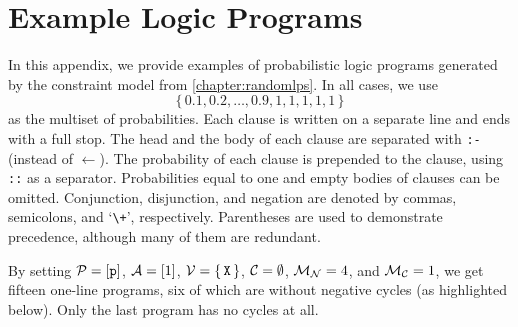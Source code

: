 \chapter{Example Logic Programs}\label{theappendix}

In this appendix, we provide examples of probabilistic logic programs generated
by the constraint model from \cref{chapter:randomlps}. In all cases, we use
\[
  \{\, 0.1, 0.2, \dots, 0.9, 1, 1, 1, 1, 1 \,\}
\]
as the multiset of probabilities. Each clause is written on a separate line and
ends with a full stop. The head and the body of each clause are separated with
\texttt{:-} (instead of $\gets$). The probability of each clause is prepended to
the clause, using \texttt{::} as a separator. Probabilities equal to one and
empty bodies of clauses can be omitted. Conjunction, disjunction, and negation
are denoted by commas, semicolons, and `\texttt{\textbackslash+}', respectively.
Parentheses are used to demonstrate precedence, although many of them are
redundant.

By setting $\mathcal{P}{} = [\texttt{p}]$, $\mathcal{A}{} = [1]$, $\mathcal{V}{} =
\{\, \texttt{X} \,\}$, $\mathcal{C}{} = \emptyset$, $\mathcal{M}_{\mathcal{N}}{} = 4$, and
$\mathcal{M}_{\mathcal{C}}{} = 1$, we get fifteen one-line programs, six of which are
without negative cycles (as highlighted below). Only the last program has no
cycles at all.

